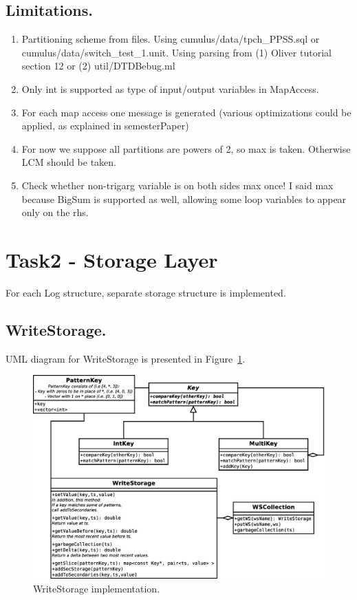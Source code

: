 \documentclass{sig-semester}
\begin{document}
\subsection{Limitations.}
\begin{enumerate}
 \item Partitioning scheme from files. Using cumulus/data/tpch\_PPSS.sql or cumulus/data/switch\_test\_1.unit. Using parsing from (1) Oliver tutorial section 12 or (2) util/DTDBebug.ml
 \item Only int is supported as type of input/output variables in MapAccess.
 \item For each map access one message is generated (various optimizations could be applied, as explained in semesterPaper)

 \item For now we suppose all partitions are powers of 2, so max is taken. Otherwise LCM should be taken.
 \item Check whether non-trigarg variable is on both sides max once! I said max because BigSum is supported as well, allowing some loop variables to appear only on the rhs.
\end{enumerate}

\section{Task2 - Storage Layer }
\vspace{2mm}
For each Log structure, separate storage structure is implemented.

\subsection{WriteStorage.} 
UML diagram for WriteStorage is presented in Figure~\ref{fig:writeStorage}.

\begin{figure}
\centering
\includegraphics[width=6in]{WriteStorage.eps}
\vspace{-3mm}
\caption{WriteStorage implementation.}
\label{fig:writeStorage}
\vspace{-2mm}
\end{figure}
\end{document}
